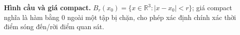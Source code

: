 \textbf{Hình cầu và giá compact.}
$B_r(x_0)=\{x\in\mathbb{R}^3:|x-x_0|<r\}$; giá compact nghĩa là hàm bằng $0$ ngoài một tập bị chặn, cho phép xác định chính xác thời điểm sóng đến/rời điểm quan sát.
